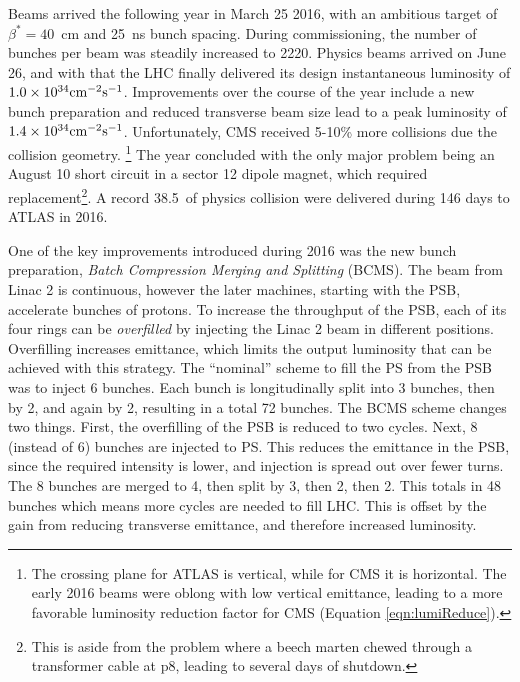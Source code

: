 Beams arrived the following year in March 25 2016, with an ambitious target of $\beta^*=40$~cm and 25~ns bunch spacing.
During commissioning, the number of bunches per beam was steadily increased to 2220.
Physics beams arrived on June 26, and with that the LHC finally delivered its design instantaneous luminosity of $1.0\times10^{34}\text{cm}^{-2}\text{s}^{-1}$.
Improvements over the course of the year include a new bunch preparation and reduced transverse beam size lead to a peak luminosity of $1.4\times10^{34}\text{cm}^{-2}\text{s}^{-1}$. \cite{lhcRun2}
Unfortunately, CMS received 5-10\% more collisions due the collision geometry. \footnote{The crossing plane for ATLAS is vertical, while for CMS it is horizontal. The early 2016 beams were oblong with low vertical emittance, leading to a more favorable luminosity reduction factor for CMS (Equation \ref{eqn:lumiReduce}).}
The year concluded with the only major problem being an August 10 short circuit in a sector 12 dipole magnet, which required replacement\footnote{This is aside from the problem where a beech marten chewed through a transformer cable at p8, leading to several days of shutdown.}.
A record 38.5~\fb of physics collision were delivered during 146 days to ATLAS in 2016.

One of the key improvements introduced during 2016 was the new bunch preparation, \emph{Batch Compression Merging and Splitting} (BCMS).
The beam from Linac 2 is continuous, however the later machines, starting with the PSB, accelerate bunches of protons. \cite{freyermuth}
To increase the throughput of the PSB, each of its four rings can be \emph{overfilled} by injecting the Linac 2 beam in different positions.
Overfilling increases emittance, which limits the output luminosity that can be achieved with this strategy.
The ``nominal'' scheme to fill the PS from the PSB was to inject 6 bunches.
Each bunch is longitudinally split into 3 bunches, then by 2, and again by 2, resulting in a total 72 bunches. \cite{freyermuth}
The BCMS scheme changes two things.
First, the overfilling of the PSB is reduced to two cycles.
Next, 8 (instead of 6) bunches are injected to PS.
This reduces the emittance in the PSB, since the required intensity is lower, and injection is spread out over fewer turns.
The 8 bunches are merged to 4, then split by 3, then 2, then 2.
This totals in 48 bunches which means more cycles are needed to fill LHC.
This is offset by the gain from reducing transverse emittance, and therefore increased luminosity. \cite{freyermuth}

